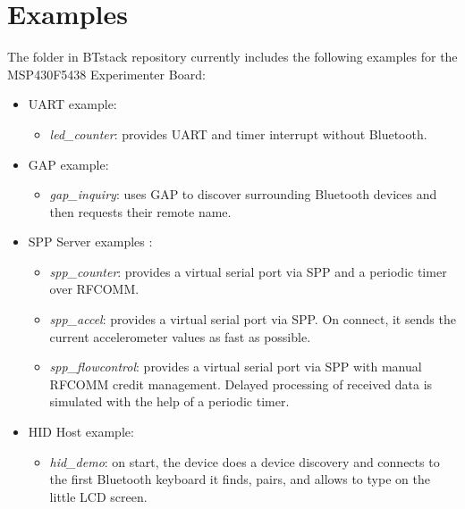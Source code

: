 \documentclass[a4paper,titlepage,oneside,12pt]{amsart} %
\begin{document}
\section{Examples}
\label{examples}
The  folder in BTstack repository currently includes the following examples for the MSP430F5438 Experimenter Board:
\begin{itemize}
\item UART example:
    \begin{itemize}
    \item \emph{led\_counter}: provides UART and timer interrupt without Bluetooth.
    \end{itemize}
\item GAP example:
    \begin{itemize}
    \item \emph{gap\_inquiry}: uses GAP to discover surrounding Bluetooth devices and then requests their remote name.
    \end{itemize}
\item SPP Server examples :
    \begin{itemize}
    \item \emph{spp\_counter}: provides a virtual serial port via SPP and a periodic timer over RFCOMM. 
    \item \emph{spp\_accel}: provides a virtual serial port via SPP. On connect, it sends the current accelerometer values as fast as possible.
    \item \emph{spp\_flowcontrol}: provides a virtual serial port via SPP with manual RFCOMM credit management. Delayed processing of received data is simulated with the help of a periodic timer. 
    \end{itemize}
\item HID Host example:
    \begin{itemize}                                    
    \item \emph{hid\_demo}: on start, the device does a device discovery and connects to the first Bluetooth keyboard it finds, pairs, and allows to type on the little LCD screen. 

\end{itemize}
\end{itemize}
\end{document}
